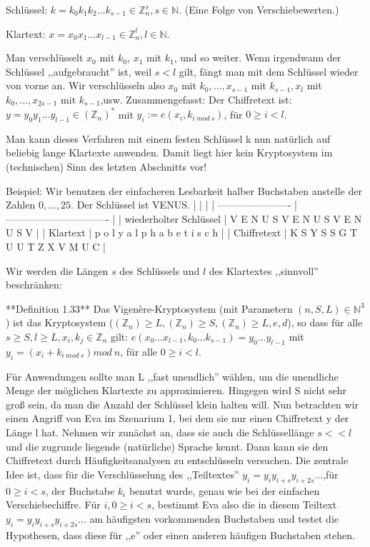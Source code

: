 \documentclass[a4paper]{article}
\begin{document}
\begin{multicols}{3}
Schlüssel: $k=k_0 k_1 k_2 ...k_{s-1}\in\mathbb{Z}^s_n,s\in\mathbb{N}$. (Eine Folge von Verschiebewerten.)

Klartext: $x=x_0 x_1...x_{l-1} \in\mathbb{Z}^l_n,l\in\mathbb{N}$.

Man verschlüsselt $x_0$ mit $k_0$, $x_1$ mit $k_1$, und so weiter. Wenn irgendwann der Schlüssel ,,aufgebraucht'' ist, weil $s<l$ gilt, fängt man mit dem Schlüssel wieder von vorne an. Wir verschlüsseln also $x_0$ mit $k_0,...,x_{s-1}$ mit $k_{s-1},x_l$ mit $k_0,...,x_{2s-1}$ mit $k_{s-1}$,usw. 
Zusammengefasst: Der Chiffretext ist: $y=y_0 y_1...y_{l-1}\in(\mathbb{Z}_n)^*$ mit $y_i:=e(x_i,k_{i\ mod\ s})$, für $0\geq i < l$.

Man kann dieses Verfahren mit einem festen Schlüssel k nun natürlich auf beliebig lange Klartexte anwenden. Damit liegt hier kein Kryptosystem im (technischen) Sinn des letzten Abschnitts vor!

Beispiel: Wir benutzen der einfacheren Lesbarkeit halber Buchstaben anstelle der Zahlen $0,...,25$. Der Schlüssel ist VENUS.
|                        |                                 |
| ---------------------- | ------------------------------- |
| wiederholter Schlüssel | V E N U S V E N U S V E N U S V |
| Klartext               | p o l y a l p h a b e t i s c h |
| Chiffretext            | K S Y S S G T U U T Z X V M U C |

Wir werden die Längen $s$ des Schlüssels und $l$ des Klartextes ,,sinnvoll'' beschränken:

**Definition 1.33** Das Vigenère-Kryptosystem (mit Parametern $(n,S,L)\in\mathbb{N}^3$) ist das Kryptosystem ($(\mathbb{Z}_n)\geq L,(\mathbb{Z}_n)\geq S,(\mathbb{Z}_n)\geq L,e,d$), so dass für alle $s\geq S,l\geq L,x_i,k_j\in\mathbb{Z}_n$ gilt: $e(x_0...x_{l-1},k_0 ...k_{s-1})=y_0 ...y_{l-1}$ mit $y_i=(x_i+k_{i\ mod\ s}) mod\ n$, für alle $0\geq i < l$.

Für Anwendungen sollte man L ,,fast unendlich'' wählen, um die unendliche Menge der möglichen Klartexte zu approximieren. Hingegen wird S nicht sehr groß sein, da man die Anzahl der Schlüssel klein halten will.
Nun betrachten wir einen Angriff von Eva im Szenarium 1, bei dem sie nur einen Chiffretext y der Länge l hat. Nehmen wir zunächst an, dass sie auch die Schlüssellänge $s<<l$ und die zugrunde liegende (natürliche) Sprache kennt. Dann kann sie den Chiffretext durch Häufigkeitsanalysen zu entschlüsseln versuchen. Die zentrale Idee ist, dass für die Verschlüsselung des ,,Teiltextes'' $y_i=y_iy_{i+s}y_{i+2s}...$,für $0\geq i<s$, der Buchstabe $k_i$ benutzt wurde, genau wie bei der einfachen Verschiebechiffre. Für $i,0\geq i<s$, bestimmt Eva also die in diesem Teiltext $y_i=y_iy_{i+s}y_{i+2s}...$ am häufigsten vorkommenden Buchstaben und testet die Hypothesen, dass diese für ,,e'' oder einen anderen häufigen Buchstaben stehen.


\end{multicols}
\end{document}
